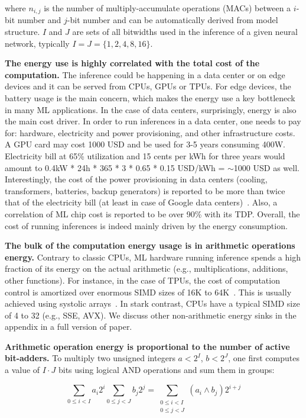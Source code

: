 where $n_{i, j}$ is the number of multiply-accumulate operations (MACs) between a $i$-bit number and $j$-bit number and can be automatically derived from model structure. $I$ and $J$ are sets of all bitwidths used in the inference of a given neural network, typically $I = J = \{1,2,4,8,16\}$.

\textbf{The energy use is highly correlated with the total cost of the computation.} The inference could be happening in a data center or on edge devices and it can be served from CPUs, GPUs or TPUs. For edge devices, the battery usage is the main concern, which makes the energy use a key bottleneck in many ML applications. In the case of data centers, surprisingly, energy is also the main cost driver. In order to run inferences in a data center, one needs to pay for: hardware, electricity and power provisioning, and other infrastructure costs. A GPU card may cost 1000 USD and be used for 3-5 years consuming 400W. Electricity bill at 65\% utilization and 15 cents per kWh for three years would amount to 0.4kW * 24h * 365 * 3 * 0.65 * 0.15 USD/kWh = $\sim$1000 USD as well. Interestingly, the cost of the power provisioning in data centers (cooling, transformers, batteries, backup generators) is reported to be more than twice that of the electricity bill (at least in case of Google data centers)~\cite{jouppi2021lessons}. Also, a correlation of ML chip cost is reported to be over 90\% with its TDP. Overall, the cost of running inferences is indeed mainly driven by the energy consumption. 

\textbf{The bulk of the computation energy usage is in arithmetic operations energy.} Contrary to classic CPUs, ML hardware running inference spends a high fraction of its energy on the actual arithmetic (e.g., multiplications, additions, other functions). For instance, in the case of TPUs, the cost of computation control is amortized over enormous SIMD sizes of 16K to 64K~\cite{jouppi2021lessons, jouppi2017tpus}. This is usually achieved using systolic arrays~\cite{kung1978systolic}. In stark contrast, CPUs have a typical SIMD size of 4 to 32 (e.g., SSE, AVX). We discuss other non-arithmetic energy sinks in the appendix in a full version of paper.

\textbf{Arithmetic operation energy is proportional to the number of active bit-adders.} To multiply two unsigned integers $a < 2^I$, $b < 2^J$, one first computes a value of $I \cdot J$ bits using logical AND operations and sum them in groups:

\begin{equation}
\label{eq:bit-distribution}
\sum_{0\leq i < I}a_i 2^i\sum_{0\leq j < J}b_j 2^j =
\sum_{\substack{0\leq i < I \\ 0\leq j < J}} \left(a_i \land b_j\right) 2^{i+j} 
\end{equation}

